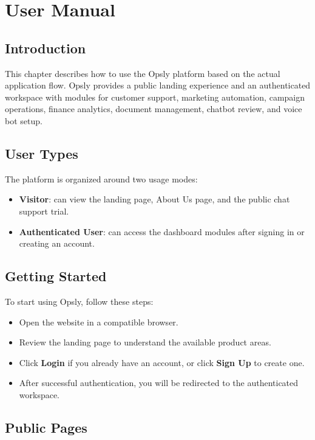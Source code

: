\chapter{User Manual}

\section{Introduction}
This chapter describes how to use the Opsly platform based on the actual application flow. Opsly provides a public landing experience and an authenticated workspace with modules for customer support, marketing automation, campaign operations, finance analytics, document management, chatbot review, and voice bot setup.

\section{User Types}
The platform is organized around two usage modes:
\begin{itemize}
    \item \textbf{Visitor}: can view the landing page, About Us page, and the public chat support trial.
    \item \textbf{Authenticated User}: can access the dashboard modules after signing in or creating an account.
\end{itemize}

\section{Getting Started}
To start using Opsly, follow these steps:
\begin{itemize}
    \item Open the website in a compatible browser.
    \item Review the landing page to understand the available product areas.
    \item Click \textbf{Login} if you already have an account, or click \textbf{Sign Up} to create one.
    \item After successful authentication, you will be redirected to the authenticated workspace.
\end{itemize}

\section{Public Pages}

